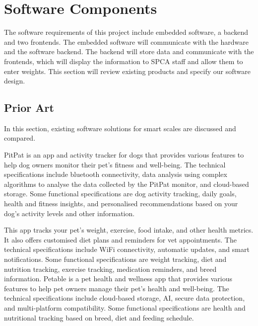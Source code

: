 
\chapter{Software Components}

The software requirements of this project include embedded software, a backend and two frontends. The embedded software will communicate with the hardware and the software backend. The backend will store data and communicate with the frontends, which will display the information to SPCA staff and allow them to enter weights. This section will review existing products and specify our software design. 

\section{Prior Art}

In this section, existing software solutions for smart scales are discussed and compared.

PitPat is an app and activity tracker for dogs that provides various features to help dog owners monitor their pet's fitness and well-being. The technical specifications include bluetooth connectivity, data analysis using complex algorithms to analyse the data collected by the PitPat monitor, and cloud-based storage. Some functional specifications are dog activity tracking, daily goals, health and fitness insights, and personalised recommendations based on your dog's activity levels and other information.

This app tracks your pet's weight, exercise, food intake, and other health metrics. It also offers customised diet plans and reminders for vet appointments. The technical specifications include WiFi connectivity, automatic updates, and smart notifications. Some functional specifications are weight tracking, diet and nutrition tracking, exercise tracking, medication reminders, and breed information.
Petable is a pet health and wellness app that provides various features to help pet owners manage their pet's health and well-being. The technical specifications include cloud-based storage, AI, secure data protection, and multi-platform compatibility. Some functional specifications are health and nutritional tracking based on breed, diet and feeding schedule.


